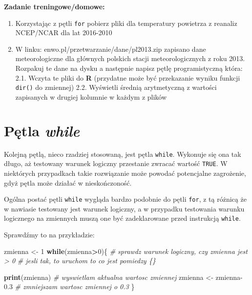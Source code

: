 \documentclass[]{book}
\newenvironment{Shaded}{\begin{snugshade}}{\end{snugshade}}
\newcommand{\KeywordTok}[1]{\textcolor[rgb]{0.13,0.29,0.53}{\textbf{#1}}}
\newcommand{\DecValTok}[1]{\textcolor[rgb]{0.00,0.00,0.81}{#1}}
\newcommand{\FloatTok}[1]{\textcolor[rgb]{0.00,0.00,0.81}{#1}}
\newcommand{\StringTok}[1]{\textcolor[rgb]{0.31,0.60,0.02}{#1}}
\newcommand{\CommentTok}[1]{\textcolor[rgb]{0.56,0.35,0.01}{\textit{#1}}}
\newcommand{\ControlFlowTok}[1]{\textcolor[rgb]{0.13,0.29,0.53}{\textbf{#1}}}
\newcommand{\OperatorTok}[1]{\textcolor[rgb]{0.81,0.36,0.00}{\textbf{#1}}}
\newcommand{\NormalTok}[1]{#1}
\providecommand{\tightlist}{%
  \setlength{\itemsep}{0pt}\setlength{\parskip}{0pt}}
\theoremstyle{definition}
\theoremstyle{definition}
\theoremstyle{definition}
\theoremstyle{remark}
\begin{document}
\textbf{Zadanie treningowe/domowe:}

\begin{enumerate}
\def\labelenumi{\arabic{enumi}.}
\tightlist
\item
  Korzystając z pętli \texttt{for} pobierz pliki dla temperatury
  powietrza z reanaliz NCEP/NCAR dla lat 2016-2010
\item
  W linku: enwo.pl/przetwarzanie/dane/pl2013.zip zapisano dane
  meteorologiczne dla głównych polskich stacji meteorologicznych z roku
  2013. Rozpakuj te dane na dysku a następnie napisz pętlę
  programistyczną która: 2.1. Wczyta te pliki do \textbf{R} (przydatne
  może być przekazanie wyniku funkcji \texttt{dir()} do zmiennej) 2.2.
  Wyświetli średnią arytmetyczną z wartości zapisanych w drugiej
  kolumnie w każdym z plików
\end{enumerate}

\section{\texorpdfstring{Pętla
\emph{while}}{Pętla while}}\label{petla-while}

Kolejną pętlą, nieco rzadziej stosowaną, jest pętla \texttt{while}.
Wykonuje się ona tak długo, aż testowany warunek logiczny przestanie
zwracać wartość \texttt{TRUE}. W niektórych przypadkach takie
rozwiązanie może powodać potencjalne zagrożenie, gdyż pętla może działać
w nieskończoność.

Ogólna postać pętli \texttt{while} wygląda bardzo podobnie do pętli
\texttt{for}, z tą różnicą że w nawiasie testowany jest warunek
logiczny, a w przypadku testowania warunku logicznego na zmiennych muszą
one być zadeklarowane przed instrukcją \texttt{while}.

Sprawdźmy to na przykładzie:

\begin{Shaded}
\begin{Highlighting}[]
\NormalTok{zmienna <-}\StringTok{ }\DecValTok{1}
\ControlFlowTok{while}\NormalTok{(zmienna}\OperatorTok{>}\DecValTok{0}\NormalTok{)\{        }\CommentTok{# sprawdz warunek logiczny, czy zmienna jest > 0}
                         \CommentTok{# jesli tak, to uruchom to co jest pomiedzy \{\}}
  
  \KeywordTok{print}\NormalTok{(zmienna)         }\CommentTok{# wyswietlam aktualna wartosc zmiennej}
\NormalTok{  zmienna <-}\StringTok{ }\NormalTok{zmienna}\FloatTok{-0.3} \CommentTok{# zmniejszam wartosc zmiennej o 0.3}
\NormalTok{\}}
\end{Highlighting}
\end{Shaded}
\end{document}
